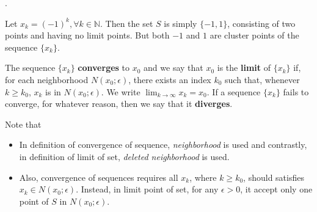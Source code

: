 \documentclass[8pt]{beamer}
\newcommand{\mbb}[1]{\mathbb{#1}}
\newcommand{\tb}[1]{\textbf{#1}}
\newcommand{\ti}[1]{\textit{#1}}
\begin{document}
\begin{frame}{.}
    \begin{example} \label{ex:3}
        Let $x_k = (-1)^k, \forall k \in \mbb{N}$.
        Then the set $S$ is simply $\{-1, 1\}$, consisting of two points and having no limit points.
        But both $-1$ and $1$ are cluster points of the sequence $\{x_k\}$.
    \end{example}

    \begin{definition}
        The sequence $\{x_k\}$ \tb{converges} to $x_0$ and we say that $x_0$ is the \tb{limit} of $
        \{x_k\}$ if, for each neighborhood $N(x_0; \epsilon)$, there exists an index $k_0$ such that, whenever $k \geq k_0$, $x_k$ is in $N(x_0; \epsilon)$.
        We write $\lim_{k \to \infty} x_k = x_0$.
        If a sequence $\{x_k\}$ fails to converge, for whatever reason, then we say that it \tb{diverges}.
    \end{definition}

    Note that
    \begin{itemize}
        \item In definition of convergence of sequence, \ti{neighborhood} is used and contrastly, in definition of limit of set, \ti{deleted neighborhood} is used.
        \item Also, convergence of sequences requires all $x_k$, where $k \geq k_0$, should satisfies $x_k \in N(x_0; \epsilon)$. Instead, in limit point of set, for any $\epsilon > 0$, it accept only one point of $S$ in $N(x_0; \epsilon)$.
    \end{itemize}

\end{frame}
\end{document}
